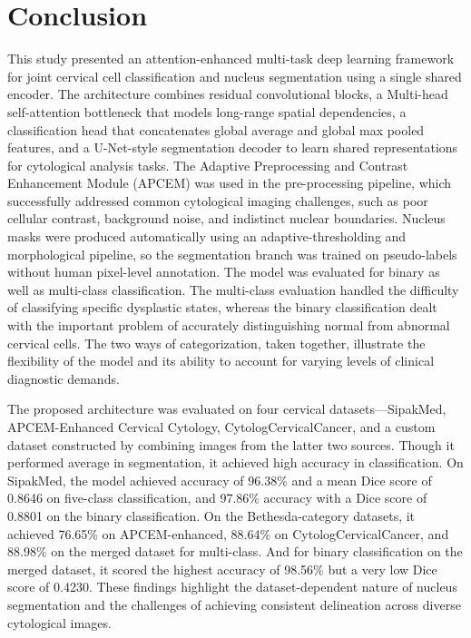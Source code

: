 \documentclass[pdflatex,sn-nature]{sn-jnl}%
\theoremstyle{thmstyleone}%
\theoremstyle{thmstyletwo}%
\theoremstyle{thmstylethree}%
\begin{document}
\section{Conclusion}

This study presented an attention-enhanced multi-task deep learning framework for joint cervical cell classification and nucleus segmentation using a single shared encoder. The architecture combines residual convolutional blocks, a Multi-head self-attention bottleneck that models long-range spatial dependencies, a classification head that concatenates global average and global max pooled features, and a U-Net-style segmentation decoder to learn shared representations for cytological analysis tasks. The Adaptive Preprocessing and Contrast Enhancement Module (APCEM) was used in the pre-processing pipeline, which successfully addressed common cytological imaging challenges, such as poor cellular contrast, background noise, and indistinct nuclear boundaries. Nucleus masks were produced automatically using an adaptive-thresholding and morphological pipeline, so the segmentation branch was trained on pseudo-labels without human pixel-level annotation. The model was evaluated for binary as well as multi-class classification. The multi-class evaluation handled the difficulty of classifying specific dysplastic states, whereas the binary classification dealt with the important problem of accurately distinguishing normal from abnormal cervical cells. The two ways of categorization, taken together, illustrate the flexibility of the model and its ability to account for varying levels of clinical diagnostic demands.

The proposed architecture was evaluated on four cervical datasets—SipakMed, APCEM-Enhanced Cervical Cytology, CytologCervicalCancer, and a custom dataset constructed by combining images from the latter two sources. Though it performed average in segmentation, it achieved high accuracy in classification. On SipakMed, the model achieved accuracy of 96.38\% and a mean Dice score of 0.8646 on five-class classification, and 97.86\% accuracy with a Dice score of 0.8801 on the binary classification. On the Bethesda-category datasets, it achieved 76.65\% on APCEM-enhanced, 88.64\% on CytologCervicalCancer, and 88.98\% on the merged dataset for multi-class. And for binary classification on the merged dataset, it scored the highest accuracy of 98.56\% but a very low Dice score of 0.4230. These findings highlight the dataset-dependent nature of nucleus segmentation and the challenges of achieving consistent delineation across diverse cytological images. 
\end{document}

